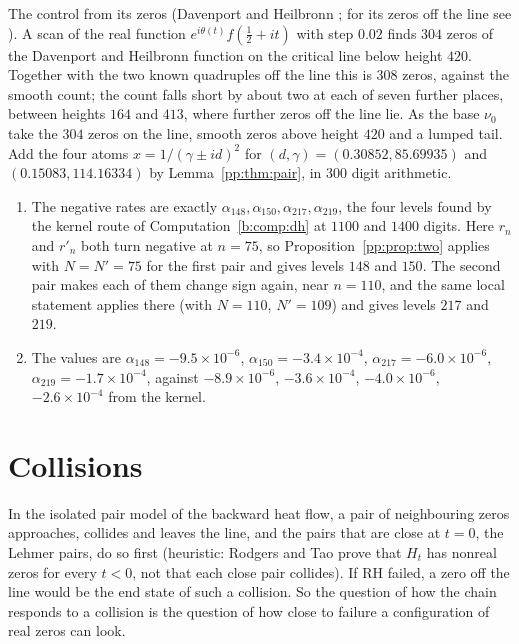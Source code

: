 \begin{computation}\label{pp:comp:control}
The control from its zeros (Davenport and Heilbronn \cite{DH36}; for its zeros off the line see \cite{Spira94,BSO07}). A scan of the real function $e^{i\theta(t)}f(\frac12+it)$ with step $0.02$ finds $304$ zeros of the Davenport and Heilbronn function on the critical line below height $420$. Together with the two known quadruples off the line this is $308$ zeros, against the smooth count; the count falls short by about two at each of seven further places, between heights $164$ and $413$, where further zeros off the line lie. As the base $\nu_0$ take the $304$ zeros on the line, smooth zeros above height $420$ and a lumped tail. Add the four atoms $x=1/(\gamma\pm id)^2$ for $(d,\gamma)=(0.30852,85.69935)$ and $(0.15083,114.16334)$ by Lemma~\ref{pp:thm:pair}, in $300$ digit arithmetic.
\begin{enumerate}
\item The negative rates are exactly $\alpha_{148},\alpha_{150},\alpha_{217},\alpha_{219}$, the four levels found by the kernel route of Computation~\ref{b:comp:dh} at $1100$ and $1400$ digits. Here $r_n$ and $r'_n$ both turn negative at $n=75$, so Proposition~\ref{pp:prop:two} applies with $N=N'=75$ for the first pair and gives levels $148$ and $150$. The second pair makes each of them change sign again, near $n=110$, and the same local statement applies there (with $N=110$, $N'=109$) and gives levels $217$ and $219$.
\item The values are $\alpha_{148}=-9.5\times10^{-6}$, $\alpha_{150}=-3.4\times10^{-4}$, $\alpha_{217}=-6.0\times10^{-6}$, $\alpha_{219}=-1.7\times10^{-4}$, against $-8.9\times10^{-6}$, $-3.6\times10^{-4}$, $-4.0\times10^{-6}$, $-2.6\times10^{-4}$ from the kernel.
\end{enumerate}
\end{computation}

\section{Collisions}\label{pp:sec:coll}

In the isolated pair model of the backward heat flow, a pair of neighbouring zeros approaches, collides and leaves the line, and the pairs that are close at $t=0$, the Lehmer pairs, do so first (heuristic: Rodgers and Tao \cite{RodgersTao} prove that $H_t$ has nonreal zeros for every $t<0$, not that each close pair collides). If RH failed, a zero off the line would be the end state of such a collision. So the question of how the chain responds to a collision is the question of how close to failure a configuration of real zeros can look.

